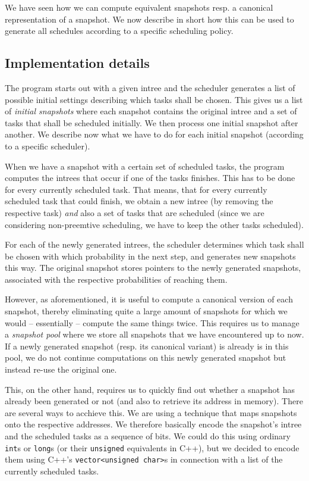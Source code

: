 We have seen how we can compute equivalent snapshots resp. a canonical representation of a snapshot. We now describe in short how this can be used to generate all schedules according to a specific scheduling policy.

\subsection{Implementation details}
\label{sec:implementation-computein-all-schedules-details}

The program starts out with a given intree and the scheduler generates a list of possible initial settings describing which tasks shall be chosen. This gives us a list of \emph{initial snapshots} where each snapshot contains the original intree and a set of tasks that shall be scheduled initially. We then process one initial snapshot after another. We describe now what we have to do for each initial snapshot (according to a specific scheduler).

When we have a snapshot with a certain set of scheduled tasks, the program computes the intrees that occur if one of the tasks finishes. This has to be done for every currently scheduled task. That means, that for every currently scheduled task that could finish, we obtain a new intree (by removing the respective task) \emph{and} also a set of tasks that are scheduled (since we are considering non-preemtive scheduling, we have to keep the other tasks scheduled).

For each of the newly generated intrees, the scheduler determines which task shall be chosen with which probability in the next step, and generates new snapshots this way. The original snapshot stores pointers to the newly generated snapshots, associated with the respective probabilities of reaching them.

However, as aforementioned, it is useful to compute a canonical version of each snapshot, thereby eliminating quite a large amount of snapshots for which we would -- essentially -- compute the same things twice. This requires us to manage a \emph{snapshot pool} where we store all snapshots that we have encountered up to now. If a newly generated snapshot (resp. its canonical variant) is already is in this pool, we do not continue computations on this newly generated snapshot but instead re-use the original one.

This, on the other hand, requires us to quickly find out whether a snapshot has already been generated or not (and also to retrieve its address in memory). There are several ways to acchieve this. We are using a technique that maps snapshots onto the respective addresses. We therefore basically encode the snapshot's intree and the scheduled tasks as a sequence of bits. We could do this using ordinary \texttt{int}s or \texttt{long}s (or their \texttt{unsigned} equivalents in C++), but we decided to encode them using C++'s \texttt{vector<unsigned char>}s in connection with a list of the currently scheduled tasks.

